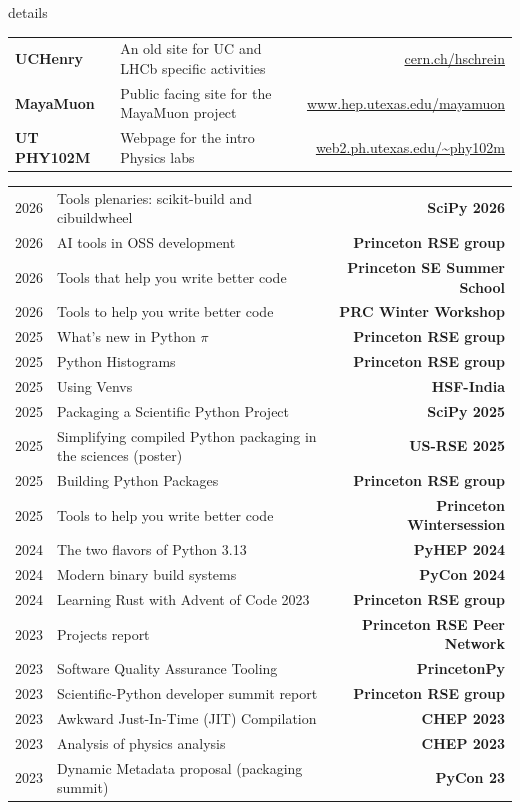 \documentclass[10pt,letterpaper]{moderncv}
\begin{document}
\begin{taggedblock}{details}
\begin{tabularx}{\textwidth}{>{\bfseries}p{1.45in}Xr}
UCHenry & An old site for UC and LHCb specific activities & \url{cern.ch/hschrein}  \\
MayaMuon & Public facing site for the MayaMuon project & \url{www.hep.utexas.edu/mayamuon} \\
UT PHY102M & Webpage for the intro Physics labs & \url{web2.ph.utexas.edu/~phy102m}  \\
\end{tabularx}
\end{taggedblock}



\begin{tabularx}{\textwidth}{p{.33in}X>{\bfseries}r}
    2026 & Tools plenaries: scikit-build and cibuildwheel & SciPy 2026 \\
    2026 & AI tools in OSS development & Princeton RSE group \\
    2026 & Tools that help you write better code & Princeton SE Summer School \\
    2026 & Tools to help you write better code & PRC Winter Workshop \\
    2025 & What's new in Python $\pi$ & Princeton RSE group \\
    2025 & Python Histograms & Princeton RSE group \\
    2025 & Using Venvs & HSF-India \\
    2025 & Packaging a Scientific Python Project & SciPy 2025 \\
    2025 & Simplifying compiled Python packaging in the sciences (poster) & US-RSE 2025 \\
    2025 & Building Python Packages & Princeton RSE group \\
    2025 & Tools to help you write better code & Princeton Wintersession \\
    2024 & The two flavors of Python 3.13 & PyHEP 2024 \\
    2024 & Modern binary build systems & PyCon 2024 \\
    2024 & Learning Rust with Advent of Code 2023 & Princeton RSE group \\
    2023 & Projects report & Princeton RSE Peer Network \\
    2023 & Software Quality Assurance Tooling & PrincetonPy \\
    2023 & Scientific-Python developer summit report & Princeton RSE group \\
    2023 & Awkward Just-In-Time (JIT) Compilation & CHEP 2023 \\
    2023 & Analysis of physics analysis & CHEP 2023 \\
    2023 & Dynamic Metadata proposal (packaging summit) & PyCon 23 \\
\end{tabularx}
\end{document}
